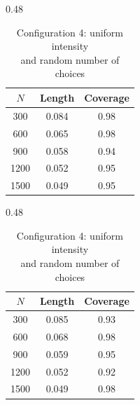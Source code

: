 \documentclass[12pt]{amsart}
\theoremstyle{plain}
\theoremstyle{remark}
\numberwithin{equation}{section}
\begin{document}
\begin{table}[htbp]
\begin{subtable}{0.48\textwidth}
\setlength{\tabcolsep}{10pt}
\begin{tabular}{ccc}
\toprule
$N$ & Length & Coverage\\
\midrule
300  & 0.084 & 0.98\\
600  & 0.065 & 0.98\\
900  & 0.058 & 0.94\\
1200 & 0.052 & 0.95\\
1500 & 0.049 & 0.95\\
\bottomrule
\end{tabular}
\centering
\caption{\centering Configuration 3: uniform intensity \\ and constant number of choices}
\end{subtable}
\hfill
\begin{subtable}{0.48\textwidth}
\setlength{\tabcolsep}{10pt}
\begin{tabular}{ccc}
\toprule
$N$ & Length & Coverage\\
\midrule
300  & 0.085 & 0.93\\
600  & 0.068 & 0.98\\
900  & 0.059 & 0.95\\
1200 & 0.052 & 0.92\\
1500 & 0.049 & 0.98\\
\bottomrule
\end{tabular}
\centering
\caption{\centering Configuration 4: uniform intensity \\ and random number of choices}
\end{subtable}

\vspace{0.4cm}


\end{table}
\end{document}
